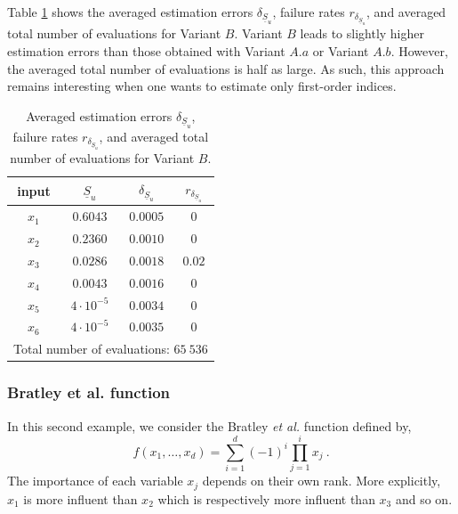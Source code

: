 Table \ref{res.gfunc.B} shows the averaged estimation errors $\delta_{\underline{S}_u}$, failure rates $r_{\delta_{\underline{S}_u}}$, and averaged total number of evaluations for Variant $B$. Variant $B$ leads to slightly higher estimation errors than those obtained with Variant $A.a$ or Variant $A.b$. However, the averaged total number of evaluations is {\color{purple}half as large}. As such, this approach remains interesting when one wants to estimate only first-order indices.
\begin{table}[t]
\caption{Averaged estimation errors $\delta_{\underline{S}_u}$, failure rates $r_{\delta_{\underline{S}_u}}$, and averaged total number of evaluations for Variant $B$.}
\centering
\begin{tabular}{cccc}
\hline
 input & $\underline{S}_u$ & $\delta_{\underline{S}_u}$ & $r_{\delta_{\underline{S}_u}}$ \\ \hline
 $x_1$ & $0.6043$ &  $0.0005$ & $0$ \\ \hline
 $x_2$ & $0.2360$ &  $0.0010$ & $0$ \\ \hline
 $x_3$ & $0.0286$ &  $0.0018$ & $0.02$ \\ \hline
 $x_4$ & $0.0043$ &  $0.0016$ & $0$    \\ \hline
 $x_5$ & $4\cdot 10^{-5}$ & $0.0034$ & $0$  \\ \hline
 $x_6$ & $4\cdot 10^{-5}$ & $0.0035$ & $0$  \\ \hline \hline
\multicolumn{4}{l}{Total number of evaluations: $65 \ 536$}\\ \hline 
\end{tabular}
\label{res.gfunc.B}
\end{table}

\subsubsection{Bratley et al. function}

In this second example, we consider the Bratley \textit{et al.} function defined by,
$$f(x_1,\dots,x_d)=\sum \limits_{i=1}^{d} (-1)^i \prod \limits_{j=1}^{i} x_j \ .$$
The importance of each variable $x_j$ depends on their own rank. More explicitly, $x_1$ is more influent than $x_2$ which is respectively more influent than $x_3$ and so on. 

